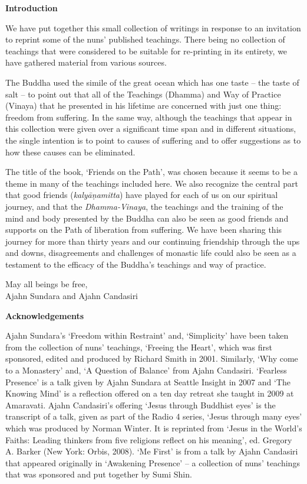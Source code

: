 
\textbf{Introduction}

We have put together this small collection of writings in response to an invitation to reprint some of the nuns' published teachings. There being no collection of teachings that were considered to be suitable for re-printing in its entirety, we have gathered material from various sources.

The Buddha used the simile of the great ocean which has one taste -- the taste of salt -- to point out that all of the Teachings (Dhamma) and Way of Practice (Vinaya) that he presented in his lifetime are concerned with just one thing: freedom from suffering. In the same way, although the teachings that appear in this collection were given over a significant time span and in different situations, the single intention is to point to causes of suffering and to offer suggestions as to how these causes can be eliminated.

The title of the book, `Friends on the Path', was chosen because it seems to be a theme in many of the teachings included here. We also recognize the central part that good friends (\textit{kaly\=a\d{n}amitta}) have played for each of us on our spiritual journey, and that the \textit{Dhamma-Vinaya}, the teachings and the training of the mind and body presented by the Buddha can also be seen as good friends and supports on the Path of liberation from suffering. We have been sharing this journey for more than thirty years and our continuing friendship through the ups and downs, disagreements and challenges of monastic life could also be seen as a testament to the efficacy of the Buddha's teachings and way of practice.
\bigskip

{\raggedleft\par
May all beings be free,\\
Ajahn Sundara and Ajahn Candasiri \par}

\textbf{Acknowledgements}

Ajahn Sundara's `Freedom within Restraint' and, `Simplicity' have been taken from the collection of nuns' teachings, `Freeing the Heart', which was first sponsored, edited and produced by Richard Smith in 2001. Similarly, `Why come to a Monastery' and, `A Question of Balance' from Ajahn Candasiri. `Fearless Presence' is a talk given by Ajahn Sundara at Seattle Insight in 2007 and `The Knowing Mind' is a reflection offered on a ten day retreat she taught in 2009 at Amaravati. Ajahn Candasiri's offering `Jesus through Buddhist eyes' is the transcript of a talk, given as part of the Radio 4 series, `Jesus through many eyes' which was produced by Norman Winter. It is reprinted from `Jesus in the World's Faiths: Leading thinkers from five religions reflect on his meaning', ed. Gregory A. Barker (New York: Orbis, 2008). `Me First' is from a talk by Ajahn Candasiri that appeared originally in `Awakening Presence' -- a collection of nuns' teachings that was sponsored and put together by Sumi Shin.

